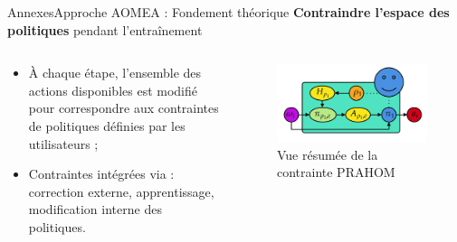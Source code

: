 \begin{frame}[allowframebreaks]{Annexes}{Approche AOMEA : Fondement théorique}
    \textbf{Contraindre l'espace des politiques} pendant l'entraînement

    \begin{columns}
    
        \begin{column}{0.3\textwidth}
    
            \begin{itemize}
                \item À chaque étape, l'ensemble des actions disponibles est modifié pour correspondre aux contraintes de politiques définies par les utilisateurs ;
                \item Contraintes intégrées via : correction externe, apprentissage, modification interne des politiques.
            \end{itemize}
    
        \end{column}
    
        \begin{column}{0.8\textwidth}
            \begin{figure}
                \centering
                \includegraphics[width=0.7\linewidth]{figures/prahom_training_constrain.png}
                \caption*{Vue résumée de la contrainte PRAHOM}
                \label{fig:prahom_process}
            \end{figure}
        \end{column}
    
    \end{columns}
\end{frame}

